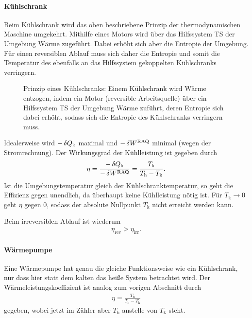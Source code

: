 \paragraph*{Kühlschrank}

Beim Kühlschrank wird das oben beschriebene Prinzip der thermodynamischen Maschine umgekehrt. Mithilfe eines Motors wird über das Hilfssystem TS der Umgebung Wärme zugeführt. Dabei erhöht sich aber die Entropie der Umgebung. Für einen reversiblen Ablauf muss sich daher die Entropie und somit die Temperatur des ebenfalls an das Hilfssystem gekoppelten Kühlschranks verringern. 


\begin{figure}[htbp]
    \centering
    \tfigFridge
    \caption{Prinzip eines Kühlschranks: Einem Kühlschrank wird Wärme entzogen, indem ein Motor (reversible Arbeitsquelle) über ein Hilfssystem TS der Umgebung Wärme zuführt, deren Entropie sich dabei erhöht, sodass sich die Entropie des Kühlschranks verringern muss. }
    \label{fig:fridge}
\end{figure}

Idealerweise wird $-\mathop{}\!\delta Q_\mathrm{k}$ maximal und $-\mathop{}\!\delta W^\mathrm{RAQ}$ minimal (wegen der Stromrechnung). Der Wirkungsgrad der Kühlleistung ist gegeben durch 
\begin{align*}
    \eta = \frac{-\mathop{}\!\delta Q_\mathrm{k}}{-\mathop{}\!\delta W^\mathrm{RAQ}} = \frac{T_\mathrm{k}}{T_\mathrm{h}-T_\mathrm{k}}. 
\end{align*}
Ist die Umgebungstemperatur gleich der Kühlschranktemperatur, so geht die Effizienz gegen unendlich, da überhaupt keine Kühlleistung nötig ist. Für $T_\mathrm{k}\rightarrow 0$ geht $\eta$ gegen $0$, sodass der absolute Nullpunkt $T_\mathrm{k}$ nicht erreicht werden kann. 

Beim irreversiblen Ablauf ist wiederum
\begin{align*}
    \eta_\mathrm{rev}>\eta_\mathrm{irr}. 
\end{align*}


\paragraph*{Wärmepumpe}

Eine Wärmepumpe hat genau die gleiche Funktionsweise wie ein Kühlschrank, nur dass hier statt dem kalten das heiße System betrachtet wird. Der Wärmeleistungskoeffizient ist analog zum vorigen Abschnitt durch 
\begin{align*}
    \eta = \frac{T_\mathrm{h}}{T_\mathrm{h}-T_\mathrm{k}}
\end{align*}
gegeben, wobei jetzt im Zähler aber $T_\mathrm{h}$ anstelle von $T_\mathrm{k}$ steht. 




